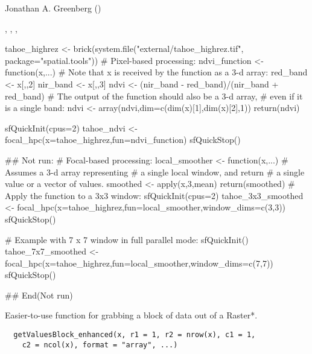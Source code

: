 \documentclass[a4paper]{book}
\begin{document}
%
\begin{Author}\relax
Jonathan A. Greenberg
()
\end{Author}
%
\begin{SeeAlso}\relax
{}, ,
, 
\end{SeeAlso}
%
\begin{Examples}
\begin{ExampleCode}
tahoe_highrez <- brick(system.file("external/tahoe_highrez.tif", package="spatial.tools"))
# Pixel-based processing:
	ndvi_function <- function(x,...)
	{
		# Note that x is received by the function as a 3-d array:
		red_band <- x[,,2]
		nir_band <- x[,,3]
		ndvi <- (nir_band - red_band)/(nir_band + red_band)
		# The output of the function should also be a 3-d array,
		# even if it is a single band:
		ndvi <- array(ndvi,dim=c(dim(x)[1],dim(x)[2],1))
		return(ndvi)
	}

	sfQuickInit(cpus=2)
 tahoe_ndvi <- focal_hpc(x=tahoe_highrez,fun=ndvi_function)
	sfQuickStop()

## Not run: 
# Focal-based processing:
local_smoother <- function(x,...)
{
 # Assumes a 3-d array representing
	# a single local window, and return
 # a single value or a vector of values.
	smoothed <- apply(x,3,mean)
	return(smoothed)
}
# Apply the function to a 3x3 window:
sfQuickInit(cpus=2)
tahoe_3x3_smoothed <- focal_hpc(x=tahoe_highrez,fun=local_smoother,window_dims=c(3,3))
sfQuickStop()

# Example with 7 x 7 window in full parallel mode:
sfQuickInit()
tahoe_7x7_smoothed <- focal_hpc(x=tahoe_highrez,fun=local_smoother,window_dims=c(7,7))
sfQuickStop()

## End(Not run)
\end{ExampleCode}
\end{Examples}
%
\begin{Description}\relax
Easier-to-use function for grabbing a block of data out
of a Raster*.
\end{Description}
%
\begin{Usage}
\begin{verbatim}
  getValuesBlock_enhanced(x, r1 = 1, r2 = nrow(x), c1 = 1,
    c2 = ncol(x), format = "array", ...)
\end{verbatim}
\end{Usage}
\end{document}
